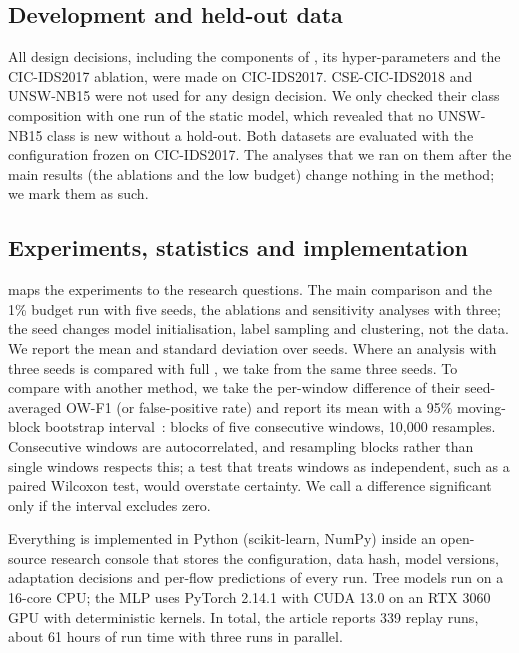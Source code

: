 \subsection{Development and held-out data}
All design decisions, including the components of \nova{}, its hyper-parameters and the CIC-IDS2017 ablation,
were made on CIC-IDS2017. CSE-CIC-IDS2018 and UNSW-NB15 were not used for any design decision. We only checked
their class composition with one run of the static model, which revealed that no UNSW-NB15 class is new without a
hold-out. Both datasets are evaluated with the configuration frozen on CIC-IDS2017. The analyses that we ran on
them after the main results (the ablations and the low budget) change nothing in the method; we mark them as such.

\subsection{Experiments, statistics and implementation}
 maps the experiments to the research questions. The main comparison and the 1\% budget run
with five seeds, the ablations and sensitivity analyses with three; the seed changes model initialisation, label
sampling and clustering, not the data. We report the mean and standard deviation over seeds. Where an analysis
with three seeds is compared with full \nova{}, we take \nova{} from the same three seeds. To compare \nova{} with another method, we take the per-window difference of their
seed-averaged OW-F1 (or false-positive rate) and report its mean with a 95\% moving-block bootstrap
interval~\cite{kunsch1989jackknife}: blocks of five consecutive windows, 10{,}000 resamples. Consecutive windows are
autocorrelated, and resampling blocks rather than single windows respects this; a test that treats windows as
independent, such as a paired Wilcoxon test, would overstate certainty. We call a difference significant only if
the interval excludes zero.

Everything is implemented in Python (scikit-learn, NumPy) inside an open-source research console that stores
the configuration, data hash, model versions, adaptation decisions and per-flow predictions of every run. Tree
models run on a 16-core CPU; the MLP uses PyTorch 2.14.1 with CUDA 13.0 on an RTX 3060 GPU with deterministic
kernels. In total, the article reports 339 replay runs, about 61 hours of run time with three runs in parallel.

